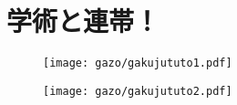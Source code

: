 \section{学術と連帯！}

\begin{figure}[H]
  \centering
  \texttt{[image: gazo/gakujututo1.pdf]}
\end{figure}

\newpage

\begin{figure}[H]
  \centering
  \texttt{[image: gazo/gakujututo2.pdf]}
\end{figure}